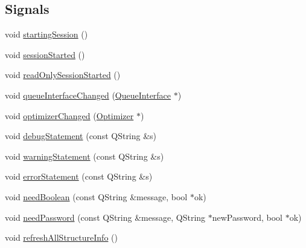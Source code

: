 \subsection*{Signals}
\begin{DoxyCompactItemize}
\item 
void \hyperlink{classGlobalSearch_1_1OptBase_ac8b7b372d127a2ba9fada95645b4b4c7}{starting\+Session} ()
\item 
void \hyperlink{classGlobalSearch_1_1OptBase_a7d786f0cf4c5e95ea0b35e3b3c9eb87e}{session\+Started} ()
\item 
void \hyperlink{classGlobalSearch_1_1OptBase_a3d614aba63df12ea0e42e2b5cb0fe050}{read\+Only\+Session\+Started} ()
\item 
void \hyperlink{classGlobalSearch_1_1OptBase_ac1e2aa7f7dc57461fd12ff47b25e7c5c}{queue\+Interface\+Changed} (\hyperlink{classGlobalSearch_1_1QueueInterface}{Queue\+Interface} $\ast$)
\item 
void \hyperlink{classGlobalSearch_1_1OptBase_a8f07729ab8372e2a41de0d38d7947c6a}{optimizer\+Changed} (\hyperlink{classGlobalSearch_1_1Optimizer}{Optimizer} $\ast$)
\item 
void \hyperlink{classGlobalSearch_1_1OptBase_aa194f330e51154ce95a6cabb7fa4fccc}{debug\+Statement} (const Q\+String \&s)
\item 
void \hyperlink{classGlobalSearch_1_1OptBase_a70a45deb53ed3dbd6a1c2c458ea88afe}{warning\+Statement} (const Q\+String \&s)
\item 
void \hyperlink{classGlobalSearch_1_1OptBase_a6bcbb9a259f9173084e2f4a82ffa0b86}{error\+Statement} (const Q\+String \&s)
\item 
void \hyperlink{classGlobalSearch_1_1OptBase_a771c4b00f1fd857750ccb3d48116334d}{need\+Boolean} (const Q\+String \&message, bool $\ast$ok)
\item 
void \hyperlink{classGlobalSearch_1_1OptBase_aa140b7676a1fee73e1d416c164232fb3}{need\+Password} (const Q\+String \&message, Q\+String $\ast$new\+Password, bool $\ast$ok)
\item 
void \hyperlink{classGlobalSearch_1_1OptBase_a3d04c32b50632a6745cc013cf91d2551}{refresh\+All\+Structure\+Info} ()
\end{DoxyCompactItemize}
